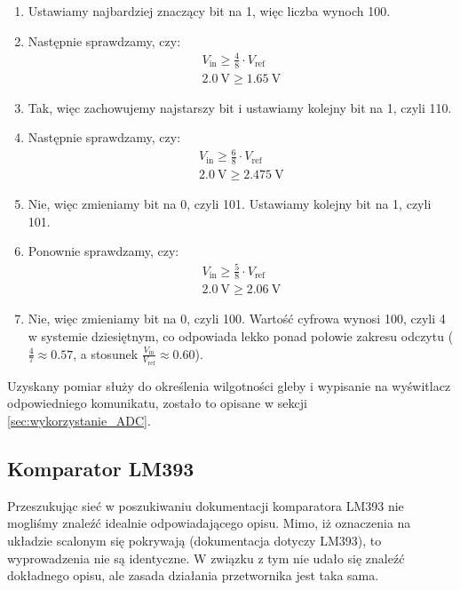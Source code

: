 \documentclass{article}
\begin{document}
    \begin{enumerate}
        \item Ustawiamy najbardziej znaczący bit na 1, więc liczba wynoch 100.
        \item Następnie sprawdzamy, czy:
            \begin{align*}
                V_{\text{in}} \geq \frac{4}{8} \cdot V_{\text{ref}}\\
                \SI{2.0}{\volt} \geq \SI{1.65}{\volt}
            \end{align*}
        \item Tak, więc zachowujemy najstarszy bit i ustawiamy kolejny bit na 1, czyli 110.
        \item Następnie sprawdzamy, czy:
            \begin{align*}
                V_{\text{in}} \geq \frac{6}{8} \cdot V_{\text{ref}}\\
                \SI{2.0}{\volt} \geq \SI{2.475}{\volt}
            \end{align*}
        \item Nie, więc zmieniamy bit na 0, czyli 101. Ustawiamy kolejny bit na 1, czyli 101.
        \item Ponownie sprawdzamy, czy:
            \begin{align*}
                V_{\text{in}} \geq \frac{5}{8} \cdot V_{\text{ref}}\\
                \SI{2.0}{\volt} \geq \SI{2.06}{\volt}
            \end{align*}
        \item Nie, więc zmieniamy bit na 0, czyli 100. Wartość cyfrowa wynosi 100, czyli 4 w systemie dziesiętnym, co odpowiada lekko ponad połowie zakresu odczytu ($\frac{4}{7} \approx 0.57$, a stosunek $\frac{V_{\text{in}}}{V_{\text{ref}}} \approx 0.60$).
        
    \end{enumerate}
    Uzyskany pomiar służy do określenia wilgotności gleby i wypisanie na wyświtlacz odpowiedniego komunikatu, zostało to opisane w sekcji \ref{sec:wykorzystanie_ADC}.
\subsection{Komparator LM393}
Przeszukując sieć w poszukiwaniu dokumentacji komparatora LM393 nie mogliśmy znaleźć idealnie odpowiadającego opisu. Mimo, iż oznaczenia na układzie scalonym się pokrywają (dokumentacja dotyczy LM393), to wyprowadzenia nie są identyczne. W związku z tym nie udało się znaleźć dokładnego opisu, ale zasada działania przetwornika jest taka sama. 
\end{document}
